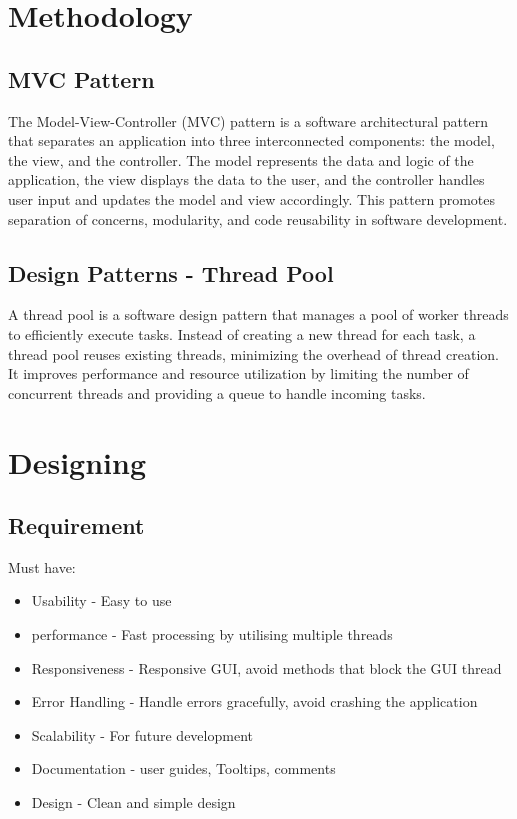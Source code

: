 \chapter{Methodology}

\section{MVC Pattern}
The Model-View-Controller (MVC) pattern is a software architectural pattern that separates an application into three interconnected components: the model, the view, and the controller. The model represents the data and logic of the application, the view displays the data to the user, and the controller handles user input and updates the model and view accordingly. This pattern promotes separation of concerns, modularity, and code reusability in software development. \cite{Verstehen19}

\section{Design Patterns - Thread Pool}
A thread pool is a software design pattern that manages a pool of worker threads to efficiently execute tasks. Instead of creating a new thread for each task, a thread pool reuses existing threads, minimizing the overhead of thread creation. It improves performance and resource utilization by limiting the number of concurrent threads and providing a queue to handle incoming tasks.\cite{Brownlee22}

\chapter{Designing}
\section{Requirement}

Must have:
\begin{itemize}
	\item Usability - Easy to use
	\item performance - Fast processing by utilising multiple threads
	\item Responsiveness - Responsive GUI, avoid methods that block the GUI thread
	\item Error Handling - Handle errors gracefully, avoid crashing the application
	\item Scalability - For future development
	\item Documentation - user guides, Tooltips, comments
	\item Design - Clean and simple design
\end{itemize}

